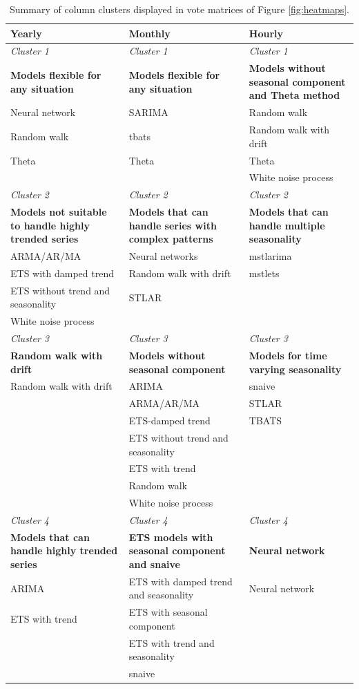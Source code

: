 \documentclass[11pt,a4paper,]{article}
\begin{document}
\begin{table}[t]
\centering\scriptsize\tabcolsep=0.12cm
\caption{Summary of column clusters displayed in vote matrices of Figure \ref{fig:heatmaps}.}
\label{cclusters}
\begin{tabular}{p{5cm}p{5cm}p{5cm}}
\toprule
\textbf{Yearly} & \textbf{Monthly} & \textbf{Hourly} \\
\midrule
\textit{Cluster 1}&\textit{Cluster 1} & \textit{Cluster 1} \\
\textbf{Models flexible for any situation} & \textbf{Models flexible for any situation} & \textbf{Models without seasonal component and Theta method } \\
Neural network & SARIMA & Random walk\\
Random walk & tbats & Random walk with drift\\
Theta & Theta & Theta\\
&  & White noise process\\
\midrule
\textit{Cluster 2}&\textit{Cluster 2} & \textit{Cluster 2} \\
\textbf{Models not suitable to handle highly trended series} & \textbf{Models that can handle series with complex patterns} & \textbf{Models that can handle multiple seasonality } \\
ARMA/AR/MA & Neural networks & mstlarima\\
ETS with damped trend & Random walk with drift & mstlets\\
ETS without trend and seasonality & STLAR & \\
White noise process &  & \\
\midrule
\textit{Cluster 3}&\textit{Cluster 3} & \textit{Cluster 3} \\
\textbf{Random walk with drift} & \textbf{Models without seasonal component} & \textbf{Models for time varying seasonality} \\
Random walk with drift & ARIMA & snaive\\
 & ARMA/AR/MA & STLAR\\
 & ETS-damped trend & TBATS\\
 & ETS without trend and seasonality & \\
  & ETS with trend  & \\
  & Random walk  & \\
  & White noise process & \\
\midrule
\textit{Cluster 4}&\textit{Cluster 4} & \textit{Cluster 4} \\
\textbf{Models that can handle highly trended series} & \textbf{ETS models with seasonal component and snaive} & \textbf{Neural network} \\
ARIMA & ETS with damped trend and seasonality & Neural network\\
ETS with trend & ETS with seasonal component & \\
 & ETS with trend and seasonality & \\
 & snaive & \\
\bottomrule
\end{tabular}
\end{table}
\end{document}
